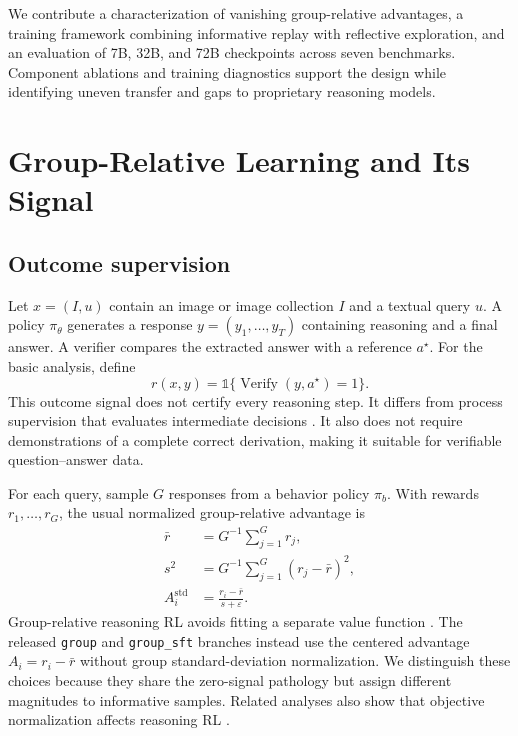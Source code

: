 \documentclass[10pt,twocolumn]{article}
\newcommand{\ind}{\mathbb{1}}
\begin{document}
We contribute a characterization of vanishing group-relative advantages, a training framework combining informative replay with reflective exploration, and an evaluation of 7B, 32B, and 72B checkpoints across seven benchmarks. Component ablations and training diagnostics support the design while identifying uneven transfer and gaps to proprietary reasoning models.

\section{Group-Relative Learning and Its Signal}
\label{sec:prelim}
\subsection{Outcome supervision}
Let $x=(I,u)$ contain an image or image collection $I$ and a textual query $u$. A policy $\pi_\theta$ generates a response $y=(y_1,\ldots,y_T)$ containing reasoning and a final answer. A verifier compares the extracted answer with a reference $a^\star$. For the basic analysis, define
\begin{equation}
 r(x,y)=\ind\{\operatorname{Verify}(y,a^\star)=1\}.
 \label{eq:reward}
\end{equation}
This outcome signal does not certify every reasoning step. It differs from process supervision that evaluates intermediate decisions \citep{letsverify,r1vl}. It also does not require demonstrations of a complete correct derivation, making it suitable for verifiable question--answer data.

For each query, sample $G$ responses from a behavior policy $\pi_b$. With rewards $r_1,\ldots,r_G$, the usual normalized group-relative advantage is
\begin{align}
 \bar r &= G^{-1}\sum_{j=1}^{G}r_j,\nonumber\\
 s^2 &= G^{-1}\sum_{j=1}^{G}(r_j-\bar r)^2,\nonumber\\
 A_i^{\mathrm{std}} &= \frac{r_i-\bar r}{s+\varepsilon}.
 \label{eq:grpo}
\end{align}
Group-relative reasoning RL avoids fitting a separate value function \citep{deepseek-r1}. The released \texttt{group} and \texttt{group\_sft} branches instead use the centered advantage $A_i=r_i-\bar r$ without group standard-deviation normalization. We distinguish these choices because they share the zero-signal pathology but assign different magnitudes to informative samples. Related analyses also show that objective normalization affects reasoning RL \citep{drgrpo,dapo}.
\end{document}
